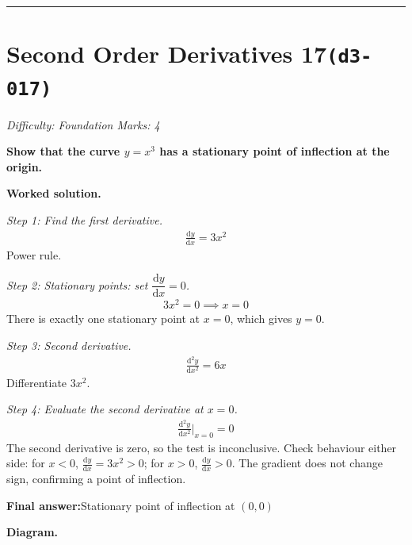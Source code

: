 \documentclass[11pt]{article}
\newcommand{\question}[1]{\par\medskip\noindent\textbf{#1}\par}
\begin{document}
\medskip\hrule

\section*{Second Order Derivatives 17\quad\small\texttt{(d3-017)}}
\textit{Difficulty: Foundation \quad\textbar\quad Marks: 4}

\question{Show that the curve \( y = x^3 \) has a stationary point of inflection at the origin.}

\textbf{Worked solution.}

\textit{Step 1: Find the first derivative.}
\[\begin{gathered}
\frac{\mathrm{d}y}{\mathrm{d}x} = 3x^2
\end{gathered}\]
Power rule.

\textit{Step 2: Stationary points: set \( \dfrac{\mathrm{d}y}{\mathrm{d}x} = 0 \).}
\[\begin{gathered}
3x^2 = 0 \implies x = 0
\end{gathered}\]
There is exactly one stationary point at \( x = 0 \), which gives \( y = 0 \).

\textit{Step 3: Second derivative.}
\[\begin{gathered}
\frac{\mathrm{d}^2y}{\mathrm{d}x^2} = 6x
\end{gathered}\]
Differentiate \(3x^2\).

\textit{Step 4: Evaluate the second derivative at \( x = 0 \).}
\[\begin{gathered}
\frac{\mathrm{d}^2y}{\mathrm{d}x^2}\bigg|_{x=0} = 0
\end{gathered}\]
The second derivative is zero, so the test is inconclusive. Check behaviour either side: for \(x < 0\), \( \frac{\mathrm{d}y}{\mathrm{d}x} = 3x^2 > 0 \); for \( x > 0 \), \( \frac{\mathrm{d}y}{\mathrm{d}x} > 0 \). The gradient does not change sign, confirming a point of inflection.

\begin{answerbox}
\textbf{Final answer:}\quad Stationary point of inflection at \(\displaystyle  (0, 0) \)
\end{answerbox}
\textbf{Diagram.}
\end{document}
